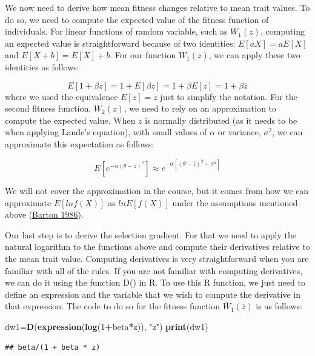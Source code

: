 \documentclass[
]{book}
\newenvironment{Shaded}{\begin{snugshade}}{\end{snugshade}}
\newcommand{\DecValTok}[1]{\textcolor[rgb]{0.00,0.00,0.81}{#1}}
\newcommand{\FunctionTok}[1]{\textcolor[rgb]{0.13,0.29,0.53}{\textbf{#1}}}
\newcommand{\NormalTok}[1]{#1}
\newcommand{\OtherTok}[1]{\textcolor[rgb]{0.56,0.35,0.01}{#1}}
\newcommand{\SpecialCharTok}[1]{\textcolor[rgb]{0.81,0.36,0.00}{\textbf{#1}}}
\newcommand{\StringTok}[1]{\textcolor[rgb]{0.31,0.60,0.02}{#1}}
\begin{document}
We now need to derive how mean fitness changes relative to mean trait values. To do so, we need to compute the expected value of the fitness function of individuals. For linear functions of random variable, such as \(W_{1}(z)\), computing an expected value is straightforward because of two identities: \(E[aX]=aE[X]\) and \(E[X+b]=E[X]+b\). For our function \(W_{1}(z)\), we can apply these two identities as follows:

\[
E[1+\beta z] = 1+E[\beta z]=1+\beta E[z]=1+\beta \overline{z}
\] where we used the equivalence \(E[z]=\overline{z}\) just to simplify the notation. For the second fitness function, \(W_{2}(z)\), we need to rely on an approximation to compute the expected value. When \(z\) is normally distributed (as it needs to be when applying Lande's equation), with small values of \(\alpha\) or variance, \(\sigma^2\), we can approximate this expectation as follows:

\[
E[e^{-\alpha\left(\theta-z\right)^2}] \approx e^{-\alpha\left[\left(\theta-\overline{z}\right)^2 + \sigma^2\right]}
\]

We will not cover the approximation in the course, but it comes from how we can approximate \(E[ln f(X)]\) as \(lnE[f(X)]\) under the assumptions mentioned above (\href{https://pubmed.ncbi.nlm.nih.gov/3744046/}{Barton 1986}).

Our last step is to derive the selection gradient. For that we need to apply the natural logarithm to the functions above and compute their derivatives relative to the mean trait value. Computing derivatives is very straightforward when you are familiar with all of the rules. If you are not familiar with computing derivatives, we can do it using the function D() in R. To use this R function, we just need to define an expression and the variable that we wish to compute the derivative in that expression. The code to do so for the fitness function \(\overline{W}_{1}(\overline{z})\) is as follows:

\begin{Shaded}
\begin{Highlighting}[]
\NormalTok{dw1}\OtherTok{=}\FunctionTok{D}\NormalTok{(}\FunctionTok{expression}\NormalTok{(}\FunctionTok{log}\NormalTok{(}\DecValTok{1}\SpecialCharTok{+}\NormalTok{beta}\SpecialCharTok{*}\NormalTok{z)), }\StringTok{"z"}\NormalTok{)}
\FunctionTok{print}\NormalTok{(dw1)}
\end{Highlighting}
\end{Shaded}

\begin{verbatim}
## beta/(1 + beta * z)
\end{verbatim}
\end{document}

